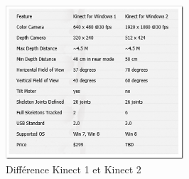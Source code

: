 \begin{figure}[H]
  \begin{center}
    \includegraphics[width=250px]{images/Kinect1vs2.png}
    \caption{Différence Kinect 1 et Kinect 2}
    \label{fig:kinect1vs2}
  \end{center}
\end{figure}

